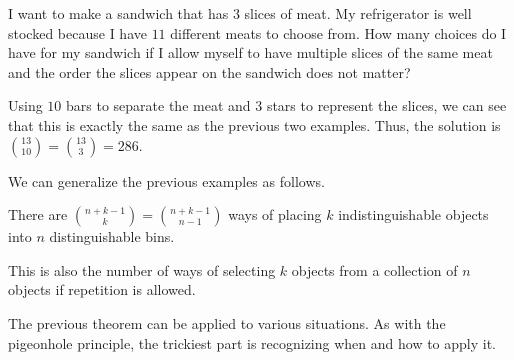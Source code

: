 \begin{exer}
I want to make a sandwich that has $3$ slices of meat.
My refrigerator is well stocked because I have $11$ different meats to choose from.
How many choices do I have for my sandwich if I allow myself to have
multiple slices of the same meat and the order the slices appear on the sandwich
does not matter?

\noindent
\answerlinethree
\begin{answer}
Using $10$ bars to separate the meat and $3$ stars to represent the slices,
we can see that this is exactly the same as the previous two examples.  Thus, 
the solution is $\binom{13}{10}=\binom{13}{3}=286.$
\end{answer}
\end{exer}

We can generalize the previous examples as follows.
\begin{thm}\label{thm:ballsbins}
There are $\displaystyle\binom{n+k-1}{k}=\binom{n+k-1}{n-1}$ ways of placing
$k$ indistinguishable objects into $n$ distinguishable bins.

This is also the number of ways of selecting $k$ objects from a collection of
$n$ objects if repetition is allowed.
\end{thm}

The previous theorem can be applied to various situations.  As with the pigeonhole
principle, the trickiest part is recognizing when and how to apply it.


